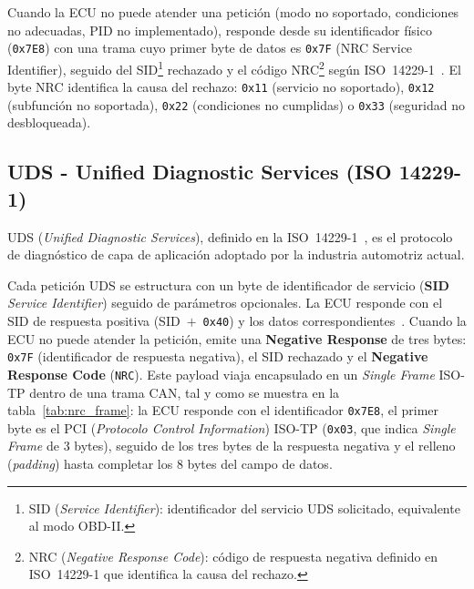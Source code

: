 Cuando la ECU no puede atender una petición (modo no soportado, condiciones no adecuadas, PID no implementado), responde desde su identificador físico (\texttt{0x7E8}) con una trama cuyo primer byte de datos es \texttt{0x7F} (NRC Service Identifier), seguido del SID\footnote{SID (\textit{Service Identifier}): identificador del servicio UDS solicitado, equivalente al modo OBD-II.} rechazado y el código NRC\footnote{NRC (\textit{Negative Response Code}): código de respuesta negativa definido en ISO~14229-1 que identifica la causa del rechazo.} según ISO~14229-1~\cite{ISO14229-1:2020}. El byte NRC identifica la causa del rechazo: \texttt{0x11} (servicio no soportado), \texttt{0x12} (subfunción no soportada), \texttt{0x22} (condiciones no cumplidas) o \texttt{0x33} (seguridad no desbloqueada).
% 


\subsection{UDS - Unified Diagnostic Services (ISO 14229-1)}
\label{sec:proto_uds}

UDS (\textit{Unified Diagnostic Services}), definido en la ISO~14229-1~\cite{ISO14229-1:2020}, es el protocolo de diagnóstico de capa de aplicación adoptado por la industria automotriz actual.

Cada petición UDS se estructura con un byte de identificador de servicio (\textbf{SID} \textit{Service Identifier}) seguido de parámetros opcionales. La ECU responde con el SID de respuesta positiva (SID~$+$~\texttt{0x40}) y los datos correspondientes~\cite{ISO14229-1:2020}. Cuando la ECU no puede atender la petición, emite una \textbf{Negative Response} de tres bytes: \texttt{0x7F} (identificador de respuesta negativa), el SID rechazado y el \textbf{Negative Response Code} (\texttt{NRC}). Este payload viaja encapsulado en un \textit{Single Frame} ISO-TP dentro de una trama CAN, tal y como se muestra en la tabla~\ref{tab:nrc_frame}: la ECU responde con el identificador \texttt{0x7E8}, el primer byte es el PCI (\textit{Protocolo Control Information}) ISO-TP (\texttt{0x03}, que indica \textit{Single Frame} de 3 bytes), seguido de los tres bytes de la respuesta negativa y el relleno (\textit{padding}) hasta completar los 8 bytes del campo de datos.

\begin{table}[H]
\caption{Trama CAN completa recibida en una respuesta negativa UDS/OBD-II: encapsulado ISO-TP (\textit{Single Frame}) del payload \textit{Negative Response} según ISO~14229-1~\cite{ISO14229-1:2020} e ISO~15765-2~\cite{ISO15765-2:2016}.}
\label{tab:nrc_frame}

\end{table}

